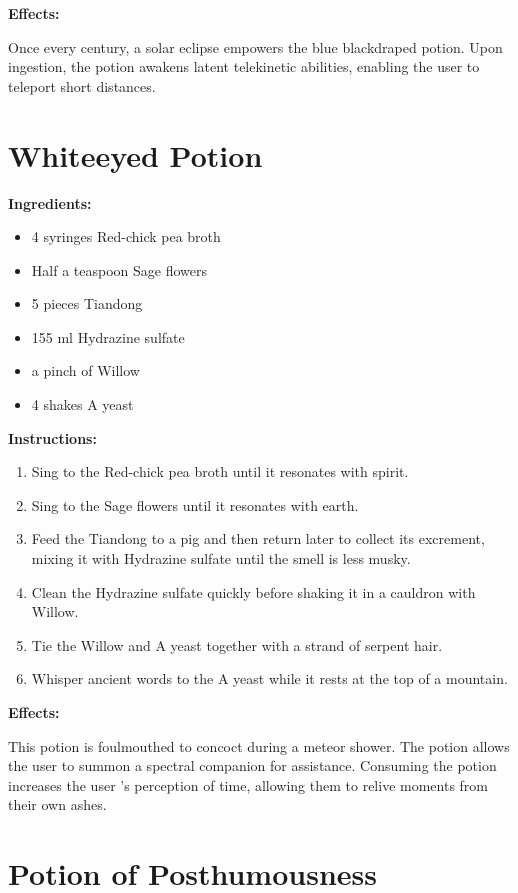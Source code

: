 \documentclass{article}
\begin{document}
\textbf{Effects:}

Once every century, a solar eclipse empowers the blue blackdraped potion. Upon ingestion, the potion awakens latent telekinetic abilities, enabling the user to teleport short distances.

\newpage
\section*{Whiteeyed Potion}

\textbf{Ingredients:}

\begin{itemize}
  \item 4 syringes Red-chick pea broth
  \item Half a teaspoon Sage flowers
  \item 5 pieces Tiandong
  \item 155 ml Hydrazine sulfate
  \item a pinch of Willow
  \item 4 shakes A yeast
\end{itemize}

\textbf{Instructions:}

\begin{enumerate}
  \item Sing to the Red-chick pea broth until it resonates with spirit.
  \item Sing to the Sage flowers until it resonates with earth.
  \item Feed the Tiandong to a pig and then return later to collect its excrement, mixing it with Hydrazine sulfate until the smell is less musky.
  \item Clean the Hydrazine sulfate quickly before shaking it in a cauldron with Willow.
  \item Tie the Willow and A yeast together with a strand of serpent hair.
  \item Whisper ancient words to the A yeast while it rests at the top of a mountain.
\end{enumerate}

\textbf{Effects:}

This potion is foulmouthed to concoct during a meteor shower. The potion allows the user to summon a spectral companion for assistance. Consuming the potion increases the user 's perception of time, allowing them to relive moments from their own ashes.

\newpage
\section*{Potion of Posthumousness}
\end{document}
